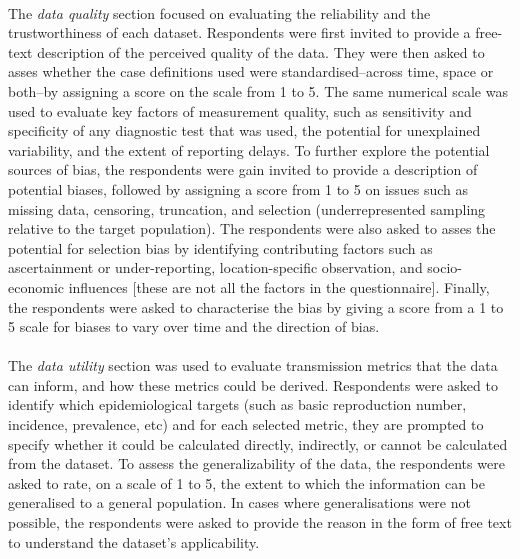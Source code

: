 \documentclass{article}
\begin{document}
\paragraph{}The \textit{data quality} section focused on evaluating the reliability and the trustworthiness of each dataset. Respondents were first invited to provide a free-text description of the perceived quality of the data. They were then asked to asses whether the case definitions used were standardised--across time, space or both--by assigning a score on the scale from 1 to 5. The same numerical scale was used to evaluate key factors of measurement quality, such as sensitivity and specificity of any diagnostic test that was used, the potential for unexplained variability, and the extent of reporting delays. To further explore the potential sources of bias, the respondents were gain invited to provide a description of potential biases, followed by assigning a score from 1 to 5 on issues such as missing data, censoring, truncation, and selection (underrepresented sampling relative to the target population). The respondents were also asked to asses the potential for selection bias by identifying contributing factors such as ascertainment or under-reporting, location-specific observation, and socio-economic influences [these are not all the factors in the questionnaire]. Finally, the respondents were asked to characterise the bias by giving a score from a 1 to 5 scale for biases to vary over time and the direction of bias. 

\paragraph{} The \textit{data utility} section was used to evaluate transmission metrics that the data can inform, and how these metrics could be derived. Respondents were asked to identify which epidemiological targets (such as basic reproduction number, incidence, prevalence, etc) and for each selected metric, they are prompted to specify whether it could be calculated directly, indirectly, or cannot be calculated from the dataset. To assess the generalizability of the data, the respondents were asked to rate, on a scale of 1 to 5, the extent to which the information can be generalised to a general population. In cases where generalisations were not possible, the respondents were asked to provide the reason in the form of free text to understand the dataset's applicability. 
\end{document}
